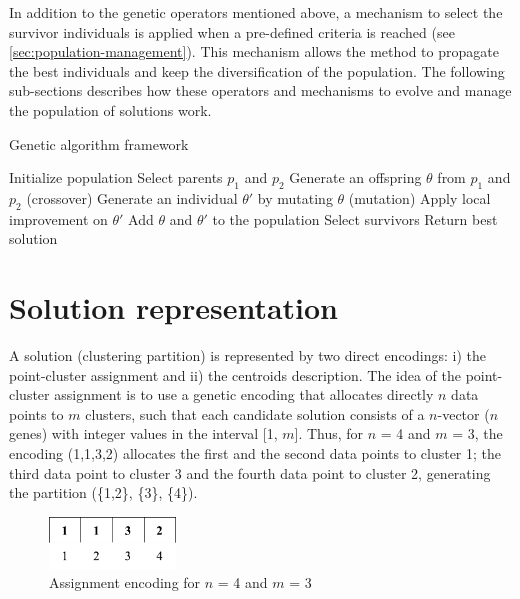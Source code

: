 In addition to the genetic operators mentioned above, a mechanism to select the survivor individuals is applied when a pre-defined criteria is reached (see \ref{sec:population-management}). This mechanism allows the method to propagate the best individuals and keep the diversification of the population. The following sub-sections describes how these operators and mechanisms to evolve and manage the population of solutions work.

\begin{algorithm}[!h]
\caption{Genetic algorithm framework}
\label{genetic-algo}
\begin{algorithmic}[1]
\STATE Initialize population
\STATE Select parents $p_1$ and $p_2$
\STATE Generate an offspring $\theta$ from $p_1$ and $p_2$ (crossover)
\STATE Generate an individual $\theta'$ by mutating $\theta$ (mutation)
\STATE Apply local improvement on $\theta'$
\STATE Add $\theta$ and $\theta'$ to the population
\STATE Select survivors
\ENDIF
\ENDWHILE
\STATE Return best solution
\end{algorithmic}
\end{algorithm}

\section{Solution representation}
\label{sec:solution-representation}
A solution (clustering partition) is represented by two direct encodings: i) the point-cluster assignment and ii) the centroids description. The idea of the point-cluster assignment is to use a genetic encoding that allocates directly $n$ data points to $m$ clusters, such that each candidate solution consists of a $n$-vector ($n$ genes) with integer values in the interval [1, $m$]. Thus, for $n$ = 4 and $m$ = 3, the encoding (1,1,3,2) allocates the first and the second data points to cluster 1; the third data point to cluster 3 and the fourth data point to cluster 2, generating the partition (\{1,2\}, \{3\}, \{4\}).

\begin{figure}[h]
  \begin{center}
    \includegraphics[width=0.3\textwidth]{img/assignment-encoding}
    \caption{Assignment encoding for $n$ = 4 and $m$ = 3}\label{fig:assignment-encoding}
  \end{center}
\end{figure}

